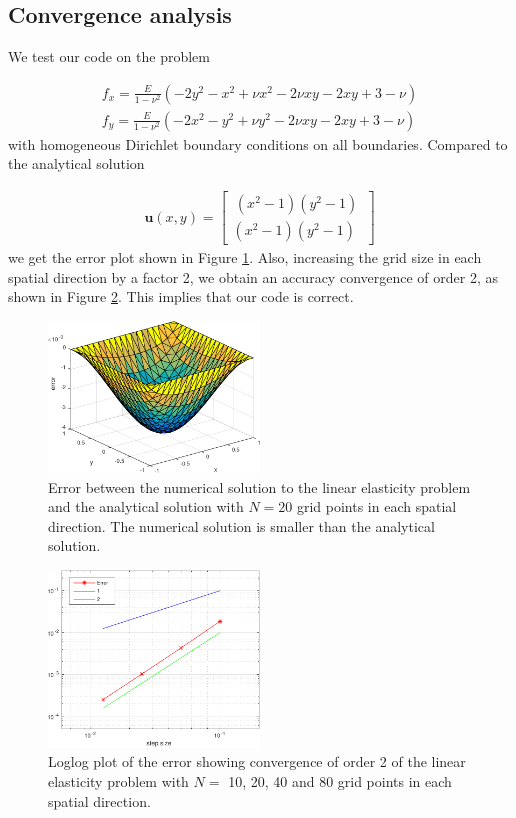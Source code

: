 
\subsection{Convergence analysis}

We test our code on the problem 

\begin{align}
f_x = \frac{E}{1-\nu^2} (-2y^2 - x^2 + \nu x^2 - 2\nu xy -2xy + 3 - \nu) \\
f_y = \frac{E}{1-\nu^2} (-2x^2 - y^2 + \nu y^2 - 2\nu xy -2xy + 3 - \nu) 
\end{align}
with homogeneous Dirichlet boundary conditions on all boundaries. Compared to the analytical solution 

\begin{align}
\bm{u}(x,y) = \begin{bmatrix}
\, (x^2-1)(y^2-1) \, \\
(x^2-1)(y^2-1)
\end{bmatrix}
\end{align}
we get the error plot shown in Figure \ref{error}. Also, increasing the grid size in each spatial direction by a factor 2, we obtain an accuracy convergence of order 2, as shown in Figure \ref{convergence}. This implies that our code is correct.

\begin{figure}
\center
\includegraphics[width=0.5\textwidth]{error_linEl}
\caption{Error between the numerical solution to the linear elasticity problem and the analytical solution with $N = 20$ grid points in each spatial direction. The numerical solution is smaller than the analytical solution.}
\label{error}
\end{figure}

\begin{figure}[ht]
\center
\includegraphics[width=0.5\textwidth]{conv_linEl}
\caption{Loglog plot of the error showing convergence of order 2 of the linear elasticity problem with $N =$ 10, 20, 40 and 80 grid points in each spatial direction. }
\label{convergence}
\end{figure}

